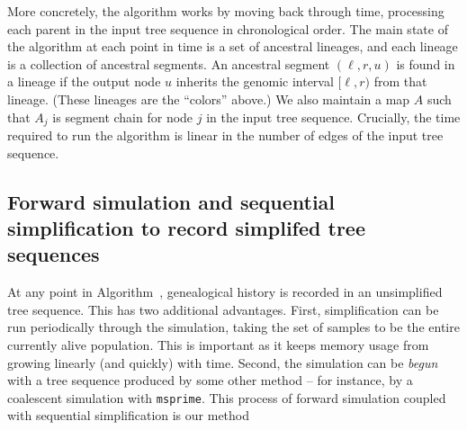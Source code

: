 \documentclass{article}
\newcommand{\msprime}{\texttt{msprime}}
\begin{document}
More concretely,
the algorithm works by moving back through time,
processing each parent in the input tree sequence in chronological order.
The main state of the algorithm at each point in time is a set of ancestral lineages,
and each lineage is a collection of ancestral segments.
An ancestral segment $(\ell, r, u)$ is found in a lineage
if the output node $u$ inherits the genomic interval $[\ell, r)$ from that lineage.
(These lineages are the ``colors'' above.)
We also maintain a map $A$ such that $A_j$ is segment chain for node $j$ in
the input tree sequence.
Crucially, the time required to run the algorithm is linear in the number of edges of the input tree sequence.

\subsection*{Forward simulation and sequential simplification to record simplifed tree sequences}

At any point in Algorithm~, genealogical history is recorded
in an unsimplified tree sequence. This has two additional advantages. First, simplification
can be run periodically through the simulation, taking the set of samples to be
the entire currently alive population. This is important as it keeps memory
usage from growing linearly (and quickly) with time. Second, the simulation can
be \emph{begun} with a tree sequence produced by some other method -- for
instance, by a coalescent simulation with \msprime. 
This process of forward simulation coupled with sequential simplification is our
method
\end{document}
